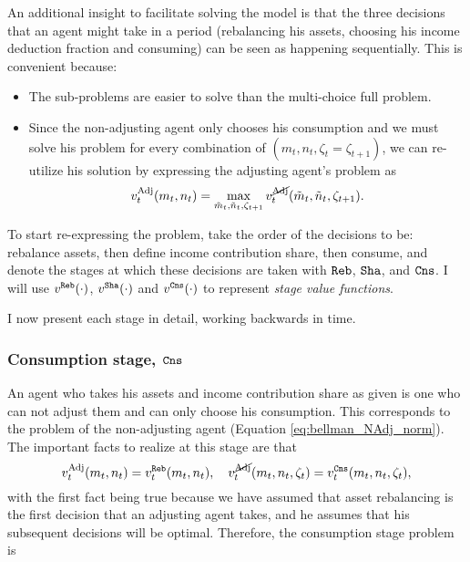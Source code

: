 \documentclass[./RiskyContrib.tex]{subfiles}
\begin{document}
An additional insight to facilitate solving the model is that the three decisions
that an agent might take in a period (rebalancing his assets, choosing his income
deduction fraction and consuming) can be seen as happening sequentially. This is
convenient because:
\begin{itemize}
\item The sub-problems are easier to solve than the multi-choice full problem.
\item Since the non-adjusting agent only chooses his consumption and we must
solve his problem for every combination of $(m_t, n_t, \zeta_t=\zeta_{t+1})$, we can re-utilize
his solution by expressing the adjusting agent's  problem as
\begin{equation*}
v_t^{\text{Adj}}(m_t,n_t) = \max_{\tilde{m}_t, \tilde{n}_t, \zeta_{t+1}} v_t^{\cancel{\text{Adj}}}(\tilde{m}_t, \tilde{n}_t, \zeta_{t+1}).
\end{equation*}
\end{itemize}

To start re-expressing the problem, take the order of the decisions to be: rebalance
assets, then define income contribution share, then consume, and denote the stages
at which these decisions are taken with $\mathtt{Reb}$, $\mathtt{Sha}$, and $\mathtt{Cns}$. I will use
$v^{\mathtt{Reb}}(\cdot)$, $v^{\mathtt{Sha}}(\cdot)$ and $v^{\mathtt{Cns}}(\cdot)$ to represent
\emph{stage value functions}.

I now present each stage in detail, working backwards in time.

\subsubsection{Consumption stage, $\mathtt{Cns}$}

An agent who takes his assets and income contribution share as given is one who
can not adjust them and can only choose his consumption. This corresponds to the
problem of the non-adjusting agent (Equation \ref{eq:bellman_NAdj_norm}). The
important facts to realize at this stage are that
\begin{equation*}
v_t^{\text{Adj}}(m_t, n_t) = v_t^{\mathtt{Reb}}(m_t, n_t), \quad v_t^{\cancel{\text{Adj}}}(m_t, n_t, \zeta_t) = v_t^{\mathtt{Cns}}(m_t, n_t, \zeta_t),
\end{equation*}
with the first fact being true because we have assumed that asset rebalancing
is the first decision that an adjusting agent takes, and he assumes that his
subsequent decisions will be optimal. Therefore, the consumption stage problem is
\begin{equation*}

\end{equation*}
\end{document}
